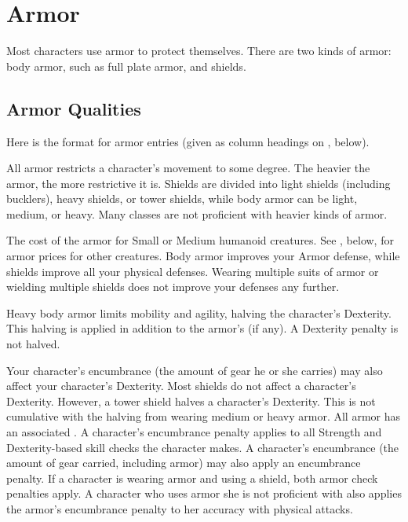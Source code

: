 \section{Armor}

Most characters use armor to protect themselves. There are two kinds of armor: body armor, such as full plate armor, and shields.

\subsection{Armor Qualities}
\par Here is the format for armor entries (given as column headings on , below).

 All armor restricts a character's movement to some degree. The heavier the armor, the more restrictive it is. Shields are divided into light shields (including bucklers), heavy shields, or tower shields, while body armor can be light, medium, or heavy. Many classes are not proficient with heavier kinds of armor.

 The cost of the armor for Small or Medium humanoid
creatures. See , below, for armor prices for other creatures.
 Body armor improves your Armor defense, while shields improve all your physical defenses. Wearing multiple suits of armor or wielding multiple shields does not improve your defenses any further.

 Heavy body armor limits mobility and agility, halving the character's Dexterity. This halving is applied in addition to the armor's  (if any). A Dexterity penalty is not halved.

Your character's encumbrance (the amount of gear he or she carries) may also affect your character's Dexterity.
 Most shields do not affect a character's Dexterity. However, a tower shield halves a character's Dexterity. This is not cumulative with the halving from wearing medium or heavy armor.
 All armor has an associated .
A character's encumbrance penalty applies to all Strength and Dexterity-based skill checks the character makes.
A character's encumbrance (the amount of gear carried, including armor) may also apply an encumbrance penalty.
 If a character is wearing armor and using a shield, both armor check penalties apply.
 A character who uses armor she is not proficient with also applies the armor's encumbrance penalty to her accuracy with physical attacks.

